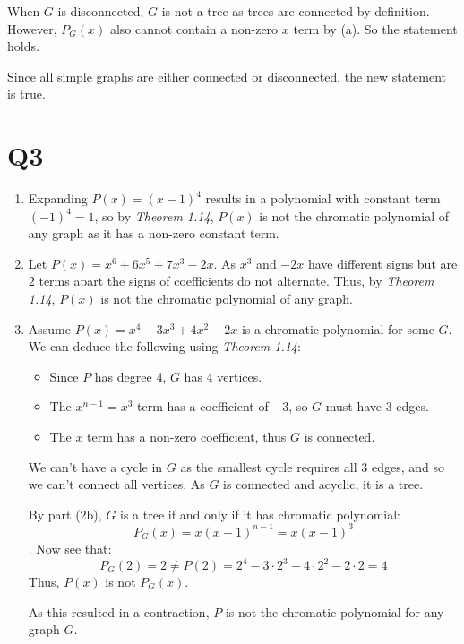 \documentclass[a4paper, 11pt]{article}
\begin{document}
\begin{multicols*}{2}
\begin{enumerate}[label=(\alph*)]
		      When $G$ is disconnected, $G$ is not a tree as trees are connected by definition. However, $P_G(x)$ also cannot contain a non-zero $x$ term by (a). So the statement holds.

		      Since all simple graphs are either connected or disconnected, the new statement is true.
	\end{enumerate}

	\section*{Q3}
	\begin{enumerate}[label=(\alph*)]
		\item Expanding $P(x)=(x-1)^4$ results in a polynomial with constant term $(-1)^4=1$, so by \textit{Theorem 1.14}, $P(x)$ is not the chromatic polynomial of any graph as it has a non-zero constant term.

		\item Let $P(x)=x^6+6x^5+7x^3-2x$. As $x^3$ and $-2x$ have different signs but are $2$ terms apart the signs of coefficients do not alternate. Thus, by \textit{Theorem 1.14}, $P(x)$ is not the chromatic polynomial of any graph.

		\item Assume $P(x)=x^4-3x^3+4x^2-2x$ is a chromatic polynomial for some $G$. We can deduce the following using \textit{Theorem 1.14}:
		      \begin{itemize}
			      \item Since $P$ has degree $4$, $G$ has $4$ vertices.
			      \item The $x^{n-1}=x^3$ term has a coefficient of $-3$, so $G$ must have $3$ edges.
			      \item The $x$ term has a non-zero coefficient, thus $G$ is connected.
		      \end{itemize}
		      We can't have a cycle in $G$ as the smallest cycle requires all $3$ edges, and so we can't connect all vertices. As $G$ is connected and acyclic, it is a tree.

		      By part (2b), $G$ is a tree if and only if it has chromatic polynomial:
		      $$P_G(x)=x(x-1)^{n-1}=x(x-1)^3$$.
		      Now see that:
		      $$P_G(2)=2 \neq P(2)= 2^4 - 3\cdot 2^3 + 4 \cdot 2^2 - 2\cdot 2 = 4$$
		      Thus, $P(x)$ is not $P_G(x)$.

		      As this resulted in a contraction, $P$ is not the chromatic polynomial for any graph $G$.
	\end{enumerate}


\end{multicols*}
\end{document}
